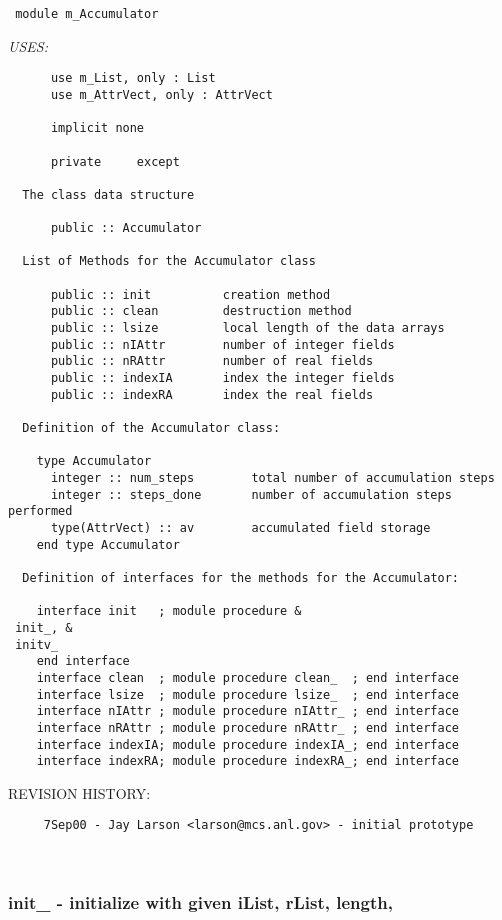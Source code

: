 \begin{verbatim} 
 module m_Accumulator\end{verbatim}{\em USES:}
\begin{verbatim}      use m_List, only : List
      use m_AttrVect, only : AttrVect
 
      implicit none
 
      private	  except
 
  The class data structure
 
      public :: Accumulator     
 
  List of Methods for the Accumulator class
 
      public :: init		  creation method
      public :: clean		  destruction method
      public :: lsize		  local length of the data arrays
      public :: nIAttr		  number of integer fields
      public :: nRAttr		  number of real fields
      public :: indexIA		  index the integer fields
      public :: indexRA		  index the real fields
 
  Definition of the Accumulator class:
 
    type Accumulator
      integer :: num_steps        total number of accumulation steps
      integer :: steps_done       number of accumulation steps performed
      type(AttrVect) :: av        accumulated field storage
    end type Accumulator
 
  Definition of interfaces for the methods for the Accumulator:
 
    interface init   ; module procedure	&
 init_,	&
 initv_
    end interface
    interface clean  ; module procedure clean_  ; end interface
    interface lsize  ; module procedure lsize_  ; end interface
    interface nIAttr ; module procedure nIAttr_ ; end interface
    interface nRAttr ; module procedure nRAttr_ ; end interface
    interface indexIA; module procedure indexIA_; end interface
    interface indexRA; module procedure indexRA_; end interface
 \end{verbatim}{\sf REVISION HISTORY:}
\begin{verbatim}  	 7Sep00 - Jay Larson <larson@mcs.anl.gov> - initial prototype\end{verbatim}
 
 
\mbox{}\hrulefill\ 
 

 \subsubsection{init\_ - initialize with given iList, rList, length, }


